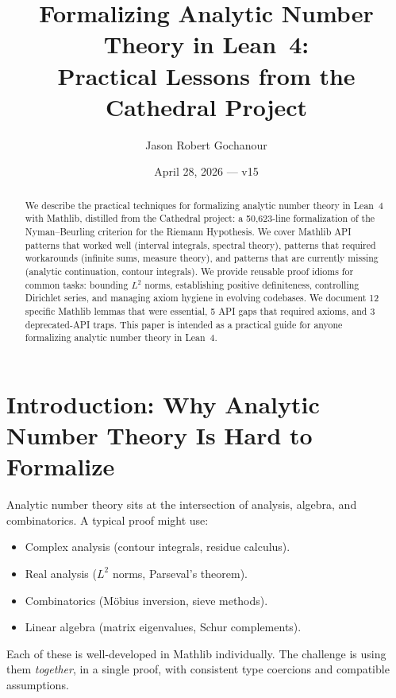 \documentclass[11pt,a4paper]{article}
\title{%
  Formalizing Analytic Number Theory in Lean~4:\\
  Practical Lessons from the Cathedral Project%
}
\author{
  Jason Robert Gochanour
}
\date{April 28, 2026 --- v15}
\begin{document}
\maketitle

\begin{abstract}
We describe the practical techniques for formalizing analytic number
theory in Lean~4 with Mathlib, distilled from the Cathedral project:
a 50{,}623-line formalization of the Nyman--Beurling criterion for the
Riemann Hypothesis. We cover Mathlib API patterns that worked well
(interval integrals, spectral theory), patterns that required
workarounds (infinite sums, measure theory), and patterns that are
currently missing (analytic continuation, contour integrals). We
provide reusable proof idioms for common tasks: bounding $L^2$ norms,
establishing positive definiteness, controlling Dirichlet series,
and managing axiom hygiene in evolving codebases. We document 12
specific Mathlib lemmas that were essential, 5 API gaps that required
axioms, and 3 deprecated-API traps. This paper is intended as a
practical guide for anyone formalizing analytic number theory in
Lean~4.
\end{abstract}

\tableofcontents

\section{Introduction: Why Analytic Number Theory Is Hard to Formalize}
\label{sec:intro}

Analytic number theory sits at the intersection of analysis, algebra,
and combinatorics. A typical proof might use:

\begin{itemize}
  \item Complex analysis (contour integrals, residue calculus).
  \item Real analysis ($L^2$ norms, Parseval's theorem).
  \item Combinatorics (M\"obius inversion, sieve methods).
  \item Linear algebra (matrix eigenvalues, Schur complements).
\end{itemize}

Each of these is well-developed in Mathlib individually. The challenge
is using them \emph{together}, in a single proof, with consistent
type coercions and compatible assumptions.
\end{document}
